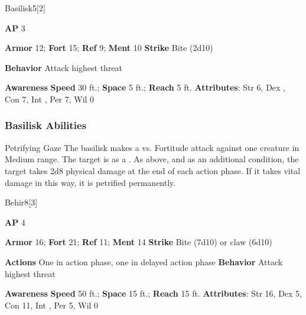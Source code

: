 \begin{monsection}{Basilisk}{5}[2]
\vspace{-1em}\vspace{-1em}
\begin{spellcontent}
\begin{spelltargetinginfo}
{\textbf{AP} 3}

\pari \textbf{Armor} 12;
\textbf{Fort} 15;
\textbf{Ref} 9;
\textbf{Ment} 10
\pari \textbf{Strike} Bite  (2d10)



\pari \textbf{Behavior} Attack highest threat
\end{spelltargetinginfo}
\end{spellcontent}

\begin{monsterfooter}
\pari \textbf{Awareness} 
\pari \textbf{Speed} 30 ft.;
\textbf{Space} 5 ft.;
\textbf{Reach} 5 ft.
\pari \textbf{Attributes}:
Str 6,
Dex ,
Con 7,
Int ,
Per 7,
Wil 0
\end{monsterfooter}
\end{monsection}


\subsubsection{Basilisk Abilities}

\begin{freeability}{Petrifying Gaze}
The basilisk makes a  vs. Fortitude attack against one creature in Medium range.
\hit The target is  as a .
\crit As above, and as an additional condition, the target takes 2d8 physical damage at the end of each action phase.
If it takes vital damage in this way, it is petrified permanently.
\end{freeability}

\begin{monsection}{Behir}{8}[3]
\vspace{-1em}\vspace{-1em}
\begin{spellcontent}
\begin{spelltargetinginfo}
{\textbf{AP} 4}

\pari \textbf{Armor} 16;
\textbf{Fort} 21;
\textbf{Ref} 11;
\textbf{Ment} 14
\pari \textbf{Strike} Bite  (7d10) or claw  (6d10)


\pari \textbf{Actions} One in action phase, one in delayed action phase
\pari \textbf{Behavior} Attack highest threat
\end{spelltargetinginfo}
\end{spellcontent}

\begin{monsterfooter}
\pari \textbf{Awareness} 
\pari \textbf{Speed} 50 ft.;
\textbf{Space} 15 ft.;
\textbf{Reach} 15 ft.
\pari \textbf{Attributes}:
Str 16,
Dex 5,
Con 11,
Int ,
Per 5,
Wil 0
\end{monsterfooter}
\end{monsection}


